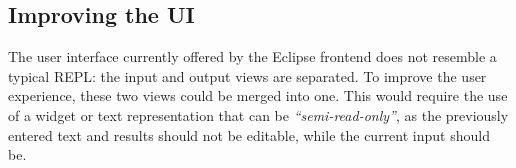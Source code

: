 \subsection{Improving the UI}

The user interface currently offered by the Eclipse frontend does not resemble a
typical REPL: the input and output views are separated. To improve the user
experience, these two views could be merged into one. This would require the use
of a widget or text representation that can be \textit{``semi-read-only''}, as
the previously entered text and results should not be editable, while the
current input should be.

